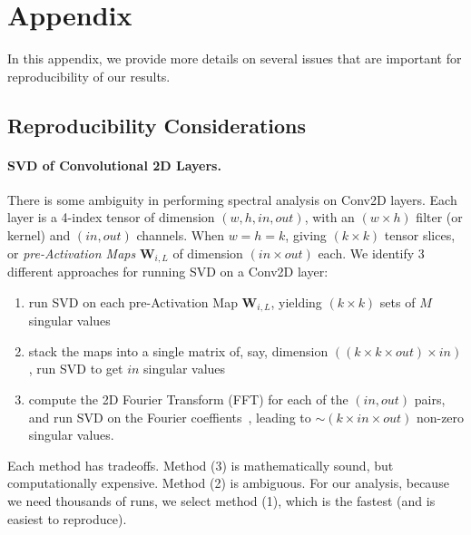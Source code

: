 \section{Appendix}
\label{sxn:appendix}

In this appendix, we provide more details on several issues that are important for reproducibility of our results.

\subsection{Reproducibility Considerations}


\paragraph{SVD of Convolutional 2D Layers.}

There is some ambiguity in performing spectral analysis on Conv2D layers.  
Each layer is a 4-index tensor of dimension $(w,h,in,out)$, with an $(w\times h)$ filter (or kernel) and $(in, out)$
channels. When $w=h=k$,  giving $(k\times k)$ tensor slices, or \emph{pre-Activation Maps} $\mathbf{W}_{i,L}$ of dimension $(in\times out)$ each. 
%
We identify 3 different approaches for running SVD on a Conv2D layer:
\begin{enumerate}
\item run SVD on each pre-Activation Map $\mathbf{W}_{i,L}$, yielding $(k\times k)$ sets of $M$ singular values
\item stack the maps into a single matrix of, say, dimension $((k\times k\times out)\times in)$, run SVD to get $in$ singular values
\item compute the 2D Fourier Transform (FFT) for each of the $(in, out)$ pairs, and run SVD on the Fourier coeffients~\cite{Long2019}, leading to $\sim(k\times in\times out)$ non-zero singular values.
\end{enumerate}
Each method has tradeoffs.  
Method (3) is mathematically sound, but computationally expensive. Method (2) is ambiguous.
For our analysis, because we need thousands of runs, we select method (1), which is the fastest (and is easiest to reproduce).


